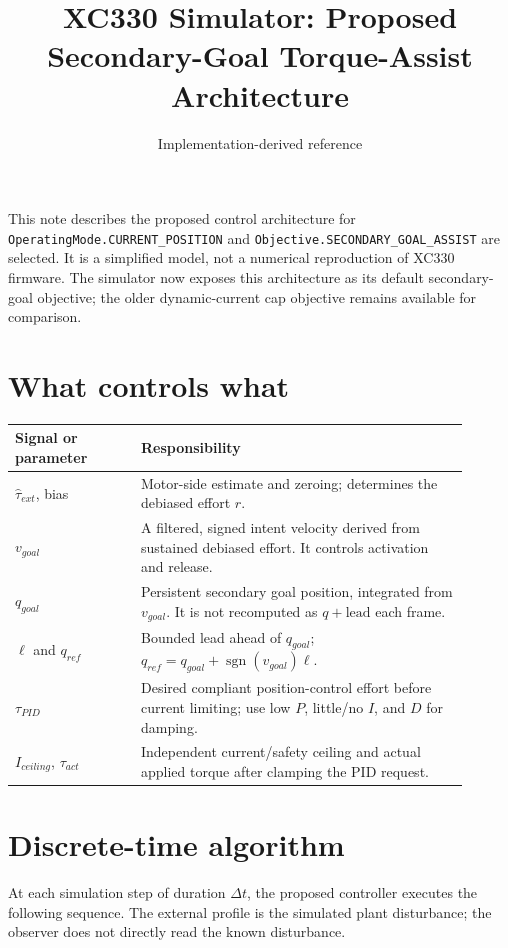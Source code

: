 \documentclass[11pt]{article}
\title{XC330 Simulator: Proposed Secondary-Goal Torque-Assist Architecture}
\author{Implementation-derived reference}
\date{}
\begin{document}
\maketitle

This note describes the proposed control architecture for
\texttt{OperatingMode.CURRENT\_POSITION} and
\texttt{Objective.SECONDARY\_GOAL\_ASSIST} are selected. It is a simplified model,
not a numerical reproduction of XC330 firmware. The simulator now exposes this
architecture as its default secondary-goal objective; the older dynamic-current
cap objective remains available for comparison.

\section*{What controls what}
\begin{center}
\begin{tabular}{p{0.25\linewidth} p{0.65\linewidth}}
\toprule
Signal or parameter & Responsibility \\
\midrule
$\hat{\tau}_{ext}$, bias & Motor-side estimate and zeroing; determines the debiased effort $r$. \\
$v_{goal}$ & A filtered, signed intent velocity derived from sustained debiased effort. It controls activation and release. \\
$q_{goal}$ & Persistent secondary goal position, integrated from $v_{goal}$. It is not recomputed as $q+\text{lead}$ each frame. \\
$\ell$ and $q_{ref}$ & Bounded lead ahead of $q_{goal}$; $q_{ref}=q_{goal}+\operatorname{sgn}(v_{goal})\ell$. \\
$\tau_{PID}$ & Desired compliant position-control effort before current limiting; use low $P$, little/no $I$, and $D$ for damping. \\
$I_{ceiling}$, $\tau_{act}$ & Independent current/safety ceiling and actual applied torque after clamping the PID request. \\
\bottomrule
\end{tabular}
\end{center}

\section*{Discrete-time algorithm}
At each simulation step of duration $\Delta t$, the proposed controller executes
the following sequence. The external profile is the simulated plant disturbance;
the observer does not directly read the known disturbance.
\end{document}
